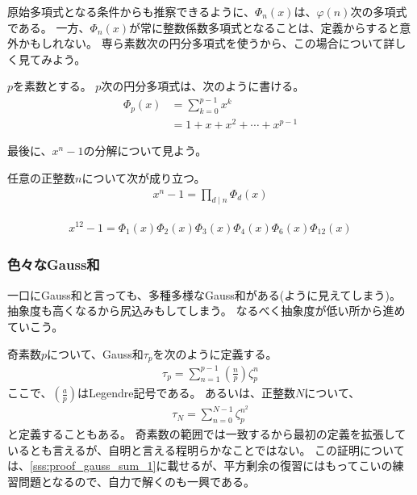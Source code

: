 原始多項式となる条件からも推察できるように、$\Phi_n(x)$は、$\varphi(n)$次の多項式である。
一方、$\Phi_n(x)$が常に整数係数多項式となることは、定義からすると意外かもしれない。
専ら素数次の円分多項式を使うから、この場合について詳しく見てみよう。

\begin{Prop}{}{}
$p$を素数とする。
$p$次の円分多項式は、次のように書ける。
\begin{align*}
\Phi_p(x) &= \sum_{k=0}^{p-1}x^k\\
&= 1 + x + x^2 + \cdots + x^{p-1}
\end{align*}
\end{Prop}

最後に、$x^n-1$の分解について見よう。

\begin{Prop}{}{}
任意の正整数$n$について次が成り立つ。
\begin{align*}
x^n-1 = \prod_{d\mid n} \Phi_d(x)
\end{align*}
\end{Prop}

\begin{Exam}{}{}\;
\begin{align*}
x^{12}-1 = \Phi_1(x)\Phi_2(x)\Phi_3(x)\Phi_4(x)\Phi_6(x)\Phi_{12}(x)
\end{align*}
\end{Exam}

\subsubsection{色々なGauss和}
一口にGauss和と言っても、多種多様なGauss和がある(ように見えてしまう)。
抽象度も高くなるから尻込みもしてしまう。
なるべく抽象度が低い所から進めていこう。

奇素数$p$について、Gauss和$\tau_p$を次のように定義する。
\begin{align}\label{eq:tau_p1}
\tau_p = \sum_{n=1}^{p-1} \left(\frac{n}{p}\right) \zeta_p^n
\end{align}
ここで、$\left(\frac{a}{p}\right)$はLegendre記号である。
あるいは、正整数$N$について、
\begin{align}\label{eq:tau_p2}
\tau_N = \sum_{n=0}^{N-1} \zeta_p^{n^2}
\end{align}
と定義することもある。
奇素数の範囲では一致するから最初の定義を拡張しているとも言えるが、自明と言える程明らかなことではない。
この証明については、\ref{sss:proof_gauss_sum_1}に載せるが、平方剰余の復習にはもってこいの練習問題となるので、自力で解くのも一興である。

